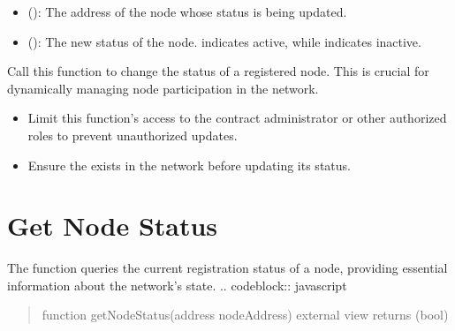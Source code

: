 \documentclass[a4paper,10pt,english]{sphinxmanual}
\begin{document}
\begin{sphinxVerbatim}[commandchars=\\\{\}]
\end{sphinxVerbatim}

\sphinxAtStartPar
{}
\begin{itemize}
\item {} 
\sphinxAtStartPar
{} ():
The address of the node whose status is being updated.

\item {} 
\sphinxAtStartPar
{} ():
The new status of the node.  indicates active, while  indicates inactive.

\end{itemize}

\sphinxAtStartPar
{}

\sphinxAtStartPar
Call this function to change the status of a registered node. This is crucial for dynamically managing node participation in the network.

\sphinxAtStartPar
{}
\begin{itemize}
\item {} 
\sphinxAtStartPar
{} Limit this function’s access to the contract administrator or other authorized roles to prevent unauthorized updates.

\item {} 
\sphinxAtStartPar
{} Ensure the  exists in the network before updating its status.

\end{itemize}


\section{Get Node Status}
\label{\detokenize{docs_node_manager_contract:get-node-status}}
\sphinxAtStartPar
The  function queries the current registration status of a node, providing essential information about the network’s state.
.. code\sphinxhyphen{}block:: javascript
\begin{quote}

\sphinxAtStartPar
function getNodeStatus(address nodeAddress) external view returns (bool)
\end{quote}
\end{document}
